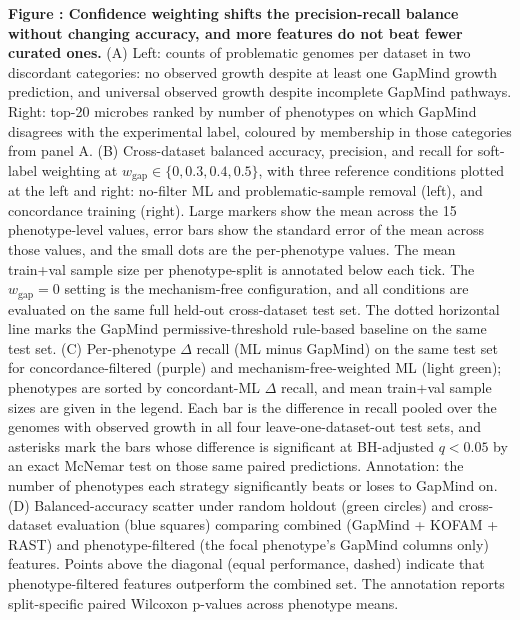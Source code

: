 \label{fig:improvement_strategies}%
\noindent\textbf{Figure : Confidence weighting shifts the precision-recall balance without changing accuracy, and more features do not beat fewer curated ones.}
(A) Left: counts of problematic genomes per dataset in two discordant categories: no observed growth despite at least one GapMind growth prediction, and universal observed growth despite incomplete GapMind pathways.
Right: top-20 microbes ranked by number of phenotypes on which GapMind disagrees with the experimental label, coloured by membership in those categories from panel A.
(B) Cross-dataset balanced accuracy, precision, and recall for soft-label weighting at $w_{\mathrm{gap}} \in \{0, 0.3, 0.4, 0.5\}$, with three reference conditions plotted at the left and right: no-filter ML and problematic-sample removal (left), and concordance training (right).
Large markers show the mean across the 15 phenotype-level values, error bars show the standard error of the mean across those values, and the small dots are the per-phenotype values. The mean train+val sample size per phenotype-split is annotated below each tick.
The $w_{\mathrm{gap}} = 0$ setting is the mechanism-free configuration, and all conditions are evaluated on the same full held-out cross-dataset test set.
The dotted horizontal line marks the GapMind permissive-threshold rule-based baseline on the same test set.
(C) Per-phenotype $\Delta$ recall (ML minus GapMind) on the same test set for concordance-filtered (purple) and mechanism-free-weighted ML (light green); phenotypes are sorted by concordant-ML $\Delta$ recall, and mean train+val sample sizes are given in the legend.
Each bar is the difference in recall pooled over the genomes with observed growth in all four leave-one-dataset-out test sets, and asterisks mark the bars whose difference is significant at BH-adjusted $q < 0.05$ by an exact McNemar test on those same paired predictions.
Annotation: the number of phenotypes each strategy significantly beats or loses to GapMind on.
(D) Balanced-accuracy scatter under random holdout (green circles) and cross-dataset evaluation (blue squares) comparing combined (GapMind + KOFAM + RAST) and phenotype-filtered (the focal phenotype's GapMind columns only) features.
Points above the diagonal (equal performance, dashed) indicate that phenotype-filtered features outperform the combined set.
The annotation reports split-specific paired Wilcoxon p-values across phenotype means.

